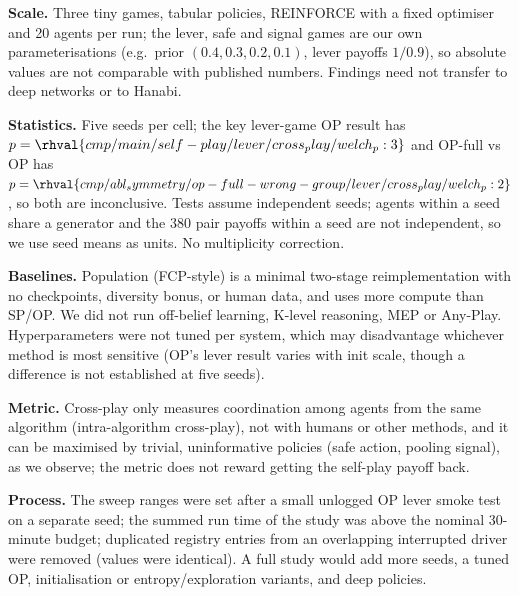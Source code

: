 \textbf{Scale.} Three tiny games, tabular policies, REINFORCE with a fixed optimiser and 20 agents per run; the lever, safe and signal games are our own parameterisations (e.g.\ prior $(0.4,0.3,0.2,0.1)$, lever payoffs $1/0.9$), so absolute values are not comparable with published numbers. Findings need not transfer to deep networks or to Hanabi.

\textbf{Statistics.} Five seeds per cell; the key lever-game OP result has $p=\rhval{cmp/main/self-play/lever/cross_play/welch_p:3}$ and OP-full vs OP has $p=\rhval{cmp/abl_symmetry/op-full-wrong-group/lever/cross_play/welch_p:2}$, so both are inconclusive. Tests assume independent seeds; agents within a seed share a generator and the 380 pair payoffs within a seed are not independent, so we use seed means as units. No multiplicity correction.

\textbf{Baselines.} Population (FCP-style) is a minimal two-stage reimplementation with no checkpoints, diversity bonus, or human data, and uses more compute than SP/OP. We did not run off-belief learning, K-level reasoning, MEP or Any-Play. Hyperparameters were not tuned per system, which may disadvantage whichever method is most sensitive (OP's lever result varies with init scale, though a difference is not established at five seeds).

\textbf{Metric.} Cross-play only measures coordination among agents from the same algorithm (intra-algorithm cross-play), not with humans or other methods, and it can be maximised by trivial, uninformative policies (safe action, pooling signal), as we observe; the metric does not reward getting the self-play payoff back.

\textbf{Process.} The sweep ranges were set after a small unlogged OP lever smoke test on a separate seed; the summed run time of the study was above the nominal 30-minute budget; duplicated registry entries from an overlapping interrupted driver were removed (values were identical). A full study would add more seeds, a tuned OP, initialisation or entropy/exploration variants, and deep policies.
